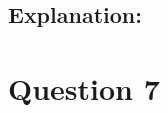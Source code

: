 \documentclass[11pt]{article}
\begin{document}
\subsection*{Explanation:}





\newpage
\section{Question 7}
\end{document}
